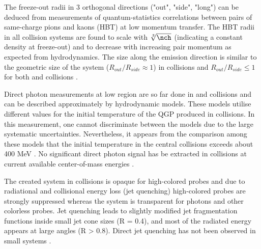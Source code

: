\documentclass[../report.tex]{subfiles}
\begin{document}
The freeze-out radii in 3 orthogonal directions ("out", "side", "long") can be deduced from measurements of quantum-statistics correlations between pairs of same-charge pions and kaons (HBT) at low momentum transfer. The HBT radii in all collision systems are found to scale with $\sqrt[3]{\nch}$ (indicating a constant density at freeze-out) and to decrease with increasing pair momentum \kT{} as expected from hydrodynamics. The size along the emission direction is similar to the geometric size of the system ($R_{out}/R_{side} \approx 1$) in \PbPb{} collisions  \cite{Adam:2015vna,Adam:2015vja,Abelev:2014pja,CMS:2014mla,Acharya:2017qtq,Acharya:2017qtq} and $R_{out}/R_{side} \leq 1$ for both \pPb{} and \pp{} collisions \cite{Abelev:2014pja,Adam:2015pya,Aamodt:2011kd,CMS:2014mla,Aaboud:2017xpw}.

Direct photon measurements at low \pt{} region are so far done in \PbPb{} and \pp{} collisions and can be described approximately by hydrodynamic models. These models utilise different values for the initial temperature of the QGP produced in \PbPb{} collisions. In this measurement, one cannot discriminate between the models due to the large systematic uncertainties. Nevertheless, it appears from the comparison among these models that the initial temperature in the central \PbPb{} collisions exceeds about 400 MeV \cite{Adam:2015lda}. No significant direct photon signal has be extracted in \pp{} collisions at current available center-of-mass energies \cite{Acharya:2018dqe}. 

The created system in \PbPb{} collisions is opaque for high-\pt colored probes and due to radiational and collisional energy loss (jet quenching) high-\pt colored probes are strongly suppressed whereas the system is transparent for photons and other colorless probes. Jet quenching leads to slightly modified jet fragmentation functions inside small jet cone sizes (R = 0.4), and most of the radiated energy appears at large angles (R > 0.8). Direct jet quenching has not been observed in small systems \cite{Aad:2010bu,Aamodt:2010jd,Chatrchyan:2011sx,CMS:2012aa,Abelev:2012hxa,ALICE:2012ab,Aad:2014bxa,Adam:2015ewa,Aad:2015wga,Adam:2016jfp,Adam:2016xbp,Sirunyan:2017jic,Sirunyan:2016fcs,Sirunyan:2018jqr,Sirunyan:2018jju,Sirunyan:2018qec,Sirunyan:2017qhf,Khachatryan:2016tfj,Sirunyan:2017bsd,Aaboud:2017bzv,Aaboud:2017eww}. 
\end{document}
